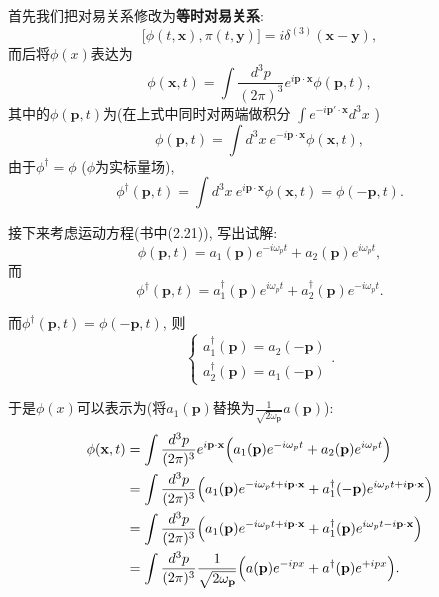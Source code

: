 首先我们把对易关系修改为\textbf{等时对易关系}:
\begin{equation}
  \bigl[\phi(t, \mathbf{x}), \pi(t, \mathbf{y})\bigr] = i\delta^{(3)}(\mathbf{x} - \mathbf{y}),
\end{equation}
而后将$\phi(x)$表达为
\begin{equation}
  \phi(\mathbf{x}, t) = \int \frac{d^3 p}{(2\pi)^3}e^{i\mathbf{p \cdot x}}\phi(\mathbf{p}, t),
\end{equation}
其中的$\phi(\mathbf{p}, t)$为(在上式中同时对两端做积分 $\int e^{-i\mathbf{p'\cdot x}} d^3 x$ )
\begin{equation}
  \phi(\mathbf{p}, t) = \int d^3 x\ e^{-i\mathbf{p \cdot x}}\phi(\mathbf{x}, t),
\end{equation}
由于$\phi^\dagger = \phi$ ($\phi$为实标量场),
\begin{equation}
  \phi^{\dagger}(\mathbf{p}, t) = \int d^3 x\ e^{i\mathbf{p \cdot x}}\phi(\mathbf{x}, t) = \phi(-\mathbf{p}, t).
\end{equation}

接下来考虑运动方程(书中(2.21)), 写出试解:
\begin{equation}
  \phi(\mathbf{p}, t) = a_1(\mathbf{p})e^{-i\omega_p t} + a_2(\mathbf{p})e^{i\omega_p t},
\end{equation}
而
\begin{equation}
  \phi^{\dagger}(\mathbf{p}, t) = a_1^{\dagger}(\mathbf{p})e^{i\omega_p t} + a_2^{\dagger}(\mathbf{p})e^{-i\omega_p t}.
\end{equation}

而$\phi^{\dagger}(\mathbf{p}, t) = \phi(-\mathbf{p}, t)$, 则
\begin{equation}
  \left\{\begin{array}{c} a_1^{\dagger}(\mathbf{p}) = a_2(\mathbf{-p})\\ a_2^{\dagger}(\mathbf{p}) = a_1(\mathbf{-p})\end{array}\right..
\end{equation}

于是$\phi(x)$可以表示为(将$a_1(\mathbf{p})$替换为$\frac{1}{\sqrt{2\omega_\mathbf{p}}} a(\mathbf{p})$):
\begin{equation}
  \begin{aligned}
    \phi(\mathbf{x}, t) & = \int \frac{d^3 p}{(2\pi)^3}e^{i\mathbf{p \cdot x}}\Bigl(a_1(\mathbf{p})e^{-i\omega_p t} + a_2(\mathbf{p})e^{i\omega_p t}\Bigr)                                \\
                        & = \int \frac{d^3 p}{(2\pi)^3}\Bigl(a_1(\mathbf{p})e^{-i\omega_p t +i\mathbf{p \cdot x}} + a_1^{\dagger}(-\mathbf{p})e^{i\omega_p t+i\mathbf{p \cdot x}}\Bigr)   \\
                        & = \int \frac{d^3 p}{(2\pi)^3}\Bigl(a_1(\mathbf{p})e^{-i\omega_p t + i\mathbf{p \cdot x}} + a_1^{\dagger}(\mathbf{p})e^{i\omega_p t - i\mathbf{p \cdot x}}\Bigr) \\
                        & = \int \frac{d^3 p}{(2\pi)^3} \frac{1}{\sqrt{2 \omega_\mathbf{p}}} \Bigl(a(\mathbf{p})e^{-ipx} + a^{\dagger}(\mathbf{p})e^{+ipx}\Bigr).
  \end{aligned}
\end{equation}

